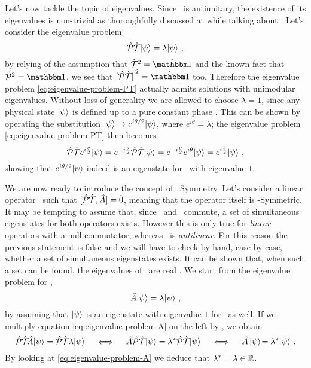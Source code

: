        Let's now tackle the topic of eigenvalues. Since \hPT\ is antiunitary, the existence of its eigenvalues is non-trivial as thoroughfully discussed at  while talking about \hT. Let's consider the eigenvalue problem
        \begin{equation}
            \label{eq:eigenvalue-problem-PT}
            \mathcal{\hat{P}}\mathcal{\hat{T}}\! \ket{\psi} = \lambda\! \ket{\psi}
            \,\text{,}
        \end{equation}
        by relying of the assumption that $\hT^2 = \togglehat{\idM}$ and the known fact that $\hP^2 = \togglehat{\idM}$, we see that $\bqty*{\hPT}^2 = \togglehat{\idM}$ too. Therefore the eigenvalue problem \eqref{eq:eigenvalue-problem-PT} actually admits solutions with unimodular eigenvalues. Without loss of generality we are allowed to choose $\lambda = 1$, since any physical state $\ket{\psi}$ is defined up to a pure constant phase \cite{Bender2005}. This can be shown by operating the substitution $\ket{\psi} \rightarrow e^{i\theta / 2}\!\ket{\psi}$, where $e^{i\theta} = \lambda$; the eigenvalue problem \eqref{eq:eigenvalue-problem-PT} then becomes
        \begin{equation*}
            \mathcal{\hat{P}}\mathcal{\hat{T}} e^{i\frac{\theta}{2}}\! \ket{\psi}
            = e^{-i\frac{\theta}{2}} \mathcal{\hat{P}}\mathcal{\hat{T}}\! \ket{\psi}
            = e^{-i\frac{\theta}{2}} e^{i\theta}\! \ket{\psi}
            = e^{i\frac{\theta}{2}}\! \ket{\psi}
            \,\text{,}
        \end{equation*}
        showing that $e^{i\theta / 2}\! \ket{\psi}$ indeed is an eigenstate for \hPT\ with eigenvalue $1$.

        We are now ready to introduce the concept of \PT\ Symmetry. Let's consider a linear operator \hA\ such that $\comm*{\hPT}{\hA}\! = \hzero$, meaning that the operator itself is \PT-Symmetric. It may be tempting to assume that, since \hA\ and \hPT\ commute, a set of simultaneous eigenstates for both operators exists. However this is only true for \emph{linear} operators with a null commutator, whereas \hPT\ is \emph{antilinear}. For this reason the previous statement is false \cite{bender2024} and we will have to check by hand, case by case, whether a set of simultaneous eigenstates exists. It can be shown that, when such a set can be found, the eigenvalues of \hA\ are real \cite{bender2024}. We start from the eigenvalue problem for \hA,
        \begin{equation}
            \label{eq:eigenvalue-problem-A}
            \hat{A}\! \ket{\psi} = \lambda\! \ket{\psi}
            \,\text{,}
        \end{equation}
        by assuming that $\ket{\psi}$ is an eigenstate with eigenvalue $1$ for \hPT\ as well. If we multiply equation \eqref{eq:eigenvalue-problem-A} on the left by \hPT, we obtain
        \begin{equation*}
            \mathcal{\hat{P}}\mathcal{\hat{T}}\! \hat{A}\! \ket{\psi} = \mathcal{\hat{P}}\mathcal{\hat{T}} \lambda\! \ket{\psi}
            \quad\iff\quad
            \hat{A} \mathcal{\hat{P}}\mathcal{\hat{T}}\! \ket{\psi} = \lambda^* \mathcal{\hat{P}}\mathcal{\hat{T}}\! \ket{\psi}
            \quad\iff\quad
            \hat{A} \ket{\psi}\! = \lambda^*\! \ket{\psi}
            \,\text{.}
        \end{equation*}
        By looking at \eqref{eq:eigenvalue-problem-A} we deduce that $\lambda^* = \lambda \in \mathbb{R}$.

